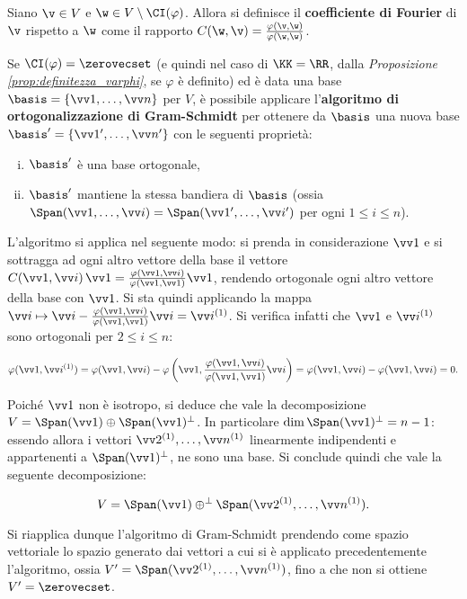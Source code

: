 \begin{definition}
	Siano $\v \in V$ e $\w \in V \setminus \CI(\varphi)$. Allora si definisce il \textbf{coefficiente di Fourier}
	di $\v$ rispetto a $\w$ come il rapporto $C(\w, \v) = \frac{\varphi(\v, \w)}{\varphi(\w, \w)}$.
\end{definition}

\begin{algorithm}
	Se $\CI(\varphi) = \zerovecset$ (e quindi nel caso di $\KK = \RR$, dalla
	\textit{Proposizione \ref{prop:definitezza_varphi}}, se $\varphi$ è definito) ed è
	data una base $\basis = \{ \vv 1, \ldots, \vv n \}$ per $V$, è possibile
	applicare l'\textbf{algoritmo di ortogonalizzazione di Gram-Schmidt} per ottenere
	da $\basis$ una nuova base $\basis' = \{ \vv 1', \ldots, \vv n' \}$ con le seguenti proprietà:
	
	\begin{enumerate}[(i)]
		\item $\basis'$ è una base ortogonale,
		\item $\basis'$ mantiene la stessa bandiera di $\basis$ (ossia $\Span(\vv 1, \ldots, \vv i) = \Span(\vv 1', \ldots, \vv i')$ per ogni $1 \leq i \leq n$).
	\end{enumerate}
	
	L'algoritmo si applica nel seguente modo: si prenda in considerazione $\vv 1$ e si sottragga ad ogni altro vettore
	della base il vettore $C(\vv 1, \vv i) \, \vv 1 = \frac{\varphi(\vv 1, \vv i)}{\varphi(\vv 1, \vv 1)} \vv 1$,
	rendendo ortogonale ogni altro vettore della base con $\vv 1$. Si sta quindi applicando la mappa
	$\vv i \mapsto \vv i - \frac{\varphi(\vv 1, \vv i)}{\varphi(\vv 1, \vv 1)} \vv i = \vv i ^{(1)}$.
	Si verifica infatti che $\vv 1$ e $\vv i ^{(1)}$ sono ortogonali per $2 \leq i \leq n$:
	
	\[ \varphi(\vv 1, \vv i^{(1)}) = \varphi(\vv 1, \vv i) - \varphi\left(\vv 1, \frac{\varphi(\vv 1, \vv i)}{\varphi(\vv 1, \vv 1)} \vv i\right) = \varphi(\vv 1, \vv i) - \varphi(\vv 1, \vv i) = 0. \]
	
	Poiché $\vv 1$ non è isotropo, si deduce che vale la decomposizione $V = \Span(\vv 1) \oplus \Span(\vv 1)^\perp$.
	In particolare $\dim \Span(\vv 1)^\perp = n-1$: essendo allora i vettori $\vv 2 ^{(1)}, \ldots, \vv n ^{(1)}$
	linearmente indipendenti e appartenenti a $\Span(\vv 1)^\perp$, ne sono una base. Si conclude quindi
	che vale la seguente decomposizione:
	
	\[ V = \Span(\vv 1) \oplus^\perp \Span(\vv 2 ^{(1)}, \ldots, \vv n ^{(1)}). \]
	
	\vskip 0.05in
	
	Si riapplica dunque l'algoritmo di Gram-Schmidt prendendo come spazio vettoriale lo spazio generato dai
	vettori a cui si è applicato precedentemente l'algoritmo, ossia $V' = \Span(\vv 2 ^{(1)}, \ldots, \vv n ^{(1)})$,
	fino a che non si ottiene $V' = \zerovecset$.
\end{algorithm}

